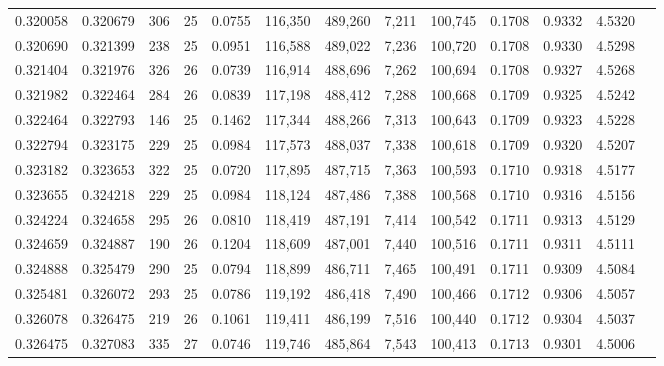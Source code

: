\begin{tabular}{rrrrrrrrrrrrr}
0.320058 & 0.320679 & 306 &  25 &                                     0.0755 & 116,350 & 489,260 &   7,211 & 100,745 & 0.1708 & 0.9332 & 4.5320 \\
0.320690 & 0.321399 & 238 &  25 &                                     0.0951 & 116,588 & 489,022 &   7,236 & 100,720 & 0.1708 & 0.9330 & 4.5298 \\
0.321404 & 0.321976 & 326 &  26 &                                     0.0739 & 116,914 & 488,696 &   7,262 & 100,694 & 0.1708 & 0.9327 & 4.5268 \\
0.321982 & 0.322464 & 284 &  26 &                                     0.0839 & 117,198 & 488,412 &   7,288 & 100,668 & 0.1709 & 0.9325 & 4.5242 \\
0.322464 & 0.322793 & 146 &  25 &                                     0.1462 & 117,344 & 488,266 &   7,313 & 100,643 & 0.1709 & 0.9323 & 4.5228 \\
0.322794 & 0.323175 & 229 &  25 &                                     0.0984 & 117,573 & 488,037 &   7,338 & 100,618 & 0.1709 & 0.9320 & 4.5207 \\
0.323182 & 0.323653 & 322 &  25 &                                     0.0720 & 117,895 & 487,715 &   7,363 & 100,593 & 0.1710 & 0.9318 & 4.5177 \\
0.323655 & 0.324218 & 229 &  25 &                                     0.0984 & 118,124 & 487,486 &   7,388 & 100,568 & 0.1710 & 0.9316 & 4.5156 \\
0.324224 & 0.324658 & 295 &  26 &                                     0.0810 & 118,419 & 487,191 &   7,414 & 100,542 & 0.1711 & 0.9313 & 4.5129 \\
0.324659 & 0.324887 & 190 &  26 &                                     0.1204 & 118,609 & 487,001 &   7,440 & 100,516 & 0.1711 & 0.9311 & 4.5111 \\
0.324888 & 0.325479 & 290 &  25 &                                     0.0794 & 118,899 & 486,711 &   7,465 & 100,491 & 0.1711 & 0.9309 & 4.5084 \\
0.325481 & 0.326072 & 293 &  25 &                                     0.0786 & 119,192 & 486,418 &   7,490 & 100,466 & 0.1712 & 0.9306 & 4.5057 \\
0.326078 & 0.326475 & 219 &  26 &                                     0.1061 & 119,411 & 486,199 &   7,516 & 100,440 & 0.1712 & 0.9304 & 4.5037 \\
0.326475 & 0.327083 & 335 &  27 &                                     0.0746 & 119,746 & 485,864 &   7,543 & 100,413 & 0.1713 & 0.9301 & 4.5006 \\

\end{tabular}
